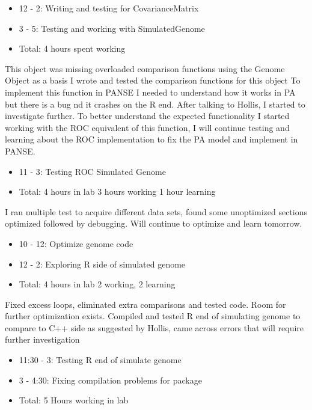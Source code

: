 \documentclass[12pt,hyperref]{labbook}
\begin{document}
\begin{itemize}
    \item 12 - 2: Writing and testing for CovarianceMatrix
    \item 3 - 5: Testing and working with SimulatedGenome
    \item Total: 4 hours spent working
\end{itemize}
This object was missing overloaded comparison functions using the Genome Object as a basis I wrote and tested the comparison functions for this object
To implement this function in PANSE I needed to understand how it works in PA but there is a bug nd it crashes on the R end. After talking to Hollis, I started to investigate further. To better understand the expected functionality I started working with the ROC equivalent of this function, I will continue testing and learning about the ROC implementation to fix the PA model and implement in PANSE.
\begin{itemize}
    \item 11 - 3: Testing ROC Simulated Genome
    \item Total: 4 hours in lab 3 hours working 1 hour learning
\end{itemize}
I ran multiple test to acquire different data sets, found some unoptimized sections optimized followed by debugging. Will continue to optimize and learn tomorrow.
\begin{itemize}
    \item 10 - 12: Optimize genome code
    \item 12 - 2: Exploring R side of simulated genome
    \item Total: 4 hours in lab 2 working, 2 learning
\end{itemize}
Fixed excess loops, eliminated extra comparisons and tested code. Room for further optimization exists.
Compiled and tested R end of simulating genome to compare to C++ side as suggested by Hollis, came across errors that will require further investigation
\begin{itemize}
    \item 11:30 - 3: Testing R end of simulate genome
    \item 3 - 4:30: Fixing compilation problems for package
    \item Total: 5 Hours working in lab
\end{itemize}
\end{document}
